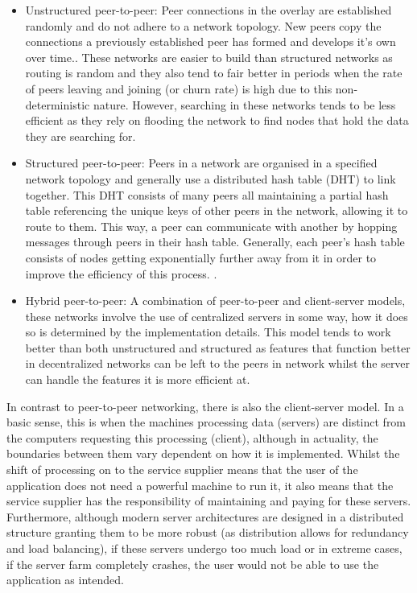 \documentclass[]{report}
\begin{document}
	\begin{itemize}
		\item Unstructured peer-to-peer:
		Peer connections in the overlay are established randomly and do not adhere to a network topology. New peers copy the connections a previously established peer has formed and develops it's own over time.\cite{P2P overlay networks}. These networks are easier to build than structured networks as routing is random and they also tend to fair better in periods when the rate of peers leaving and joining (or churn rate) is high due to this non-deterministic nature. However, searching in these networks tends to be less efficient as they rely on flooding the network to find nodes that hold the data they are searching for.
		\item Structured peer-to-peer:
		Peers in a network are organised in a specified network topology and generally use a distributed hash table (DHT) to link together. This DHT consists of many peers all maintaining a partial hash table referencing the unique keys of other peers in the network, allowing it to route to them. This way, a peer can communicate with another by hopping messages through peers in their hash table. Generally, each peer's hash table consists of nodes getting exponentially further away from it in order to improve the efficiency of this process. \cite{P2P overlay networks}. 
		\item Hybrid peer-to-peer:
		A combination of peer-to-peer and client-server models, these networks involve the use of centralized servers in some way, how it does so is determined by the implementation details.  This model tends to work better than both unstructured and structured as features that function better in decentralized networks can be left to the peers in network whilst the server can handle the features it is more efficient at. \cite{Hybrid P2P network}
	\end{itemize}
				
	In contrast to peer-to-peer networking, there is also the client-server model. In a basic sense, this is when the machines processing data (servers) are distinct from the computers requesting this processing (client), although in actuality, the boundaries between them vary dependent on how it is implemented. Whilst the shift of processing on to the service supplier means that the user of the application does not need a powerful machine to run it, it also means that the service supplier has the responsibility of maintaining and paying for these servers. Furthermore, although modern server architectures are designed in a distributed structure granting them to be more robust (as distribution allows for redundancy and load balancing), if these servers undergo too much load or in extreme cases, if the server farm completely crashes, the user would not be able to use the application as intended.
	
\end{document}
